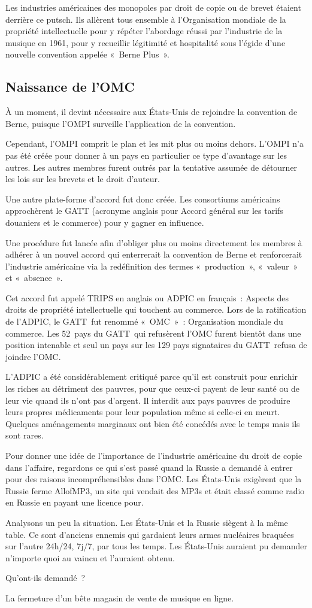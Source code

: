 Les industries américaines des monopoles par droit de copie ou de brevet étaient derrière ce putsch. Ils allèrent tous ensemble à l'Organisation mondiale de la propriété intellectuelle pour y répéter
l'abordage réussi par l'industrie de la musique en 1961, pour y recueillir légitimité et hospitalité sous l'égide d'une nouvelle convention appelée «~Berne Plus~».

\subsection{Naissance de l'OMC}
À un moment, il devint nécessaire aux États-Unis de rejoindre la convention de Berne, puisque l'OMPI surveille l'application de la convention.

Cependant, l'OMPI comprit le plan et les mit plus ou moins dehors. L'OMPI n'a pas été créée pour donner à un pays en particulier ce type d'avantage sur les autres. Les autres membres furent outrés par
la tentative assumée de détourner les lois sur les brevets et le droit d'auteur.

Une autre plate-forme d'accord fut donc créée. Les consortiums américains approchèrent le GATT (acronyme anglais pour Accord général sur les tarifs douaniers et le commerce) pour y gagner en
influence. 

Une procédure fut lancée afin d'obliger plus ou moins directement les membres à adhérer à un nouvel accord qui enterrerait la convention de Berne et renforcerait l'industrie américaine via
la redéfinition des termes «~production~», «~valeur~» et «~absence~». 

Cet accord fut appelé TRIPS en anglais ou ADPIC en français~: Aspects des droits de propriété intellectuelle qui
touchent au commerce. Lors de la ratification de l'ADPIC, le GATT fut renommé «~OMC~»~: Organisation mondiale du commerce. Les 52 pays du GATT qui refusèrent l'OMC furent bientôt dans une position
intenable et seul un pays sur les 129 pays signataires du GATT refusa de joindre l'OMC.  

L'ADPIC a été considérablement critiqué parce qu'il est construit pour enrichir les riches au détriment des pauvres, pour que ceux-ci payent de leur santé ou de leur vie quand ils n'ont pas d'argent.
Il interdit aux pays pauvres de produire leurs propres médicaments pour leur population même si celle-ci en meurt. Quelques aménagements marginaux ont bien été concédés avec le temps mais ils sont rares.

Pour donner une idée de l'importance de l'industrie américaine du droit de copie dans l'affaire, regardons ce qui s'est passé quand la Russie a demandé à entrer pour des raisons incompréhensibles dans l'OMC. Les États-Unis exigèrent que la Russie ferme AllofMP3, un site qui vendait des MP3s et était classé comme radio en Russie en payant une licence pour.

Analysons un peu la situation. Les États-Unis et la Russie siègent à la même table. Ce sont d'anciens ennemis qui gardaient leurs armes nucléaires braquées sur l'autre 24h/24, 7j/7, par tous les
temps. Les États-Unis auraient pu demander n'importe quoi au vaincu et l'auraient obtenu. 

Qu'ont-ils demandé~?

La fermeture d'un bête magasin de vente de musique en ligne.
